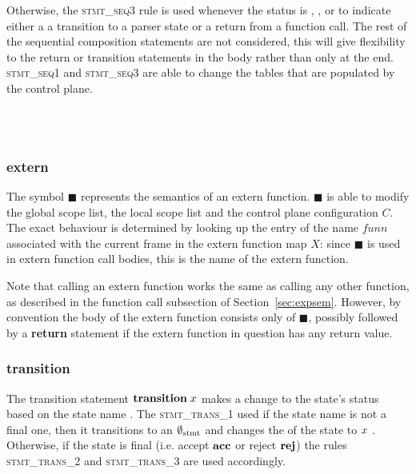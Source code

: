 \documentclass[UTF8]{article}
\begin{document}
Otherwise, the \textsc{stmt\_seq3}  rule is used whenever the status is \returnst{}, \accept{} , \reject{} or \trans{} to indicate either a a transition to a parser state or a return from a function call. The rest of the sequential composition statements are not considered, this will give flexibility to the return or transition statements in the body rather than only at the end.
\textsc{stmt\_seq1} and \textsc{stmt\_seq3} are able to change the tables that are populated by the control plane.

\begin{figure}[h!]
    \ottusedrule{\ottdrulestmtXXseqOne{}} \\
    \ottusedrule{\ottdrulestmtXXseqTwo{}} \\
    \ottusedrule{\ottdrulestmtXXseqThree{}}
\end{figure}


\subsubsection*{extern}
The symbol $\blacksquare$ represents the semantics of an extern function. $\blacksquare$ is able to modify the global scope list, the local scope list and the control plane configuration $C$. The exact behaviour is determined by looking up the entry of the name $\mathit{funn}$ associated with the current frame in the extern function map $X$: since $\blacksquare$ is used in extern function call bodies, this is the name of the extern function.

Note that calling an extern function works the same as calling any other function, as described in the function call subsection of Section~\ref{sec:expsem}. However, by convention the body of the extern function consists only of $\blacksquare$, possibly followed by a \textbf{return} statement if the extern function in question has any return value.

\begin{figure}[ht!]
    \ottusedrule{\ottdrulestmtXXext{}}
\end{figure}

\subsubsection*{transition}
The transition statement $\mathbf{transition} \; x $ makes a change to the state's status \status{} based on the state name \vn{}. The \textsc{stmt\_trans\_1} used if the state name is not a final one, then it transitions to an $\emptyset_{ \mathrm{stmt} }{}$ and changes the \status{} of the state to \trans{} $x$ . Otherwise, if the state is final (i.e. accept $\textbf{acc}$ or reject $\reject$) the rules \textsc{stmt\_trans\_2} and \textsc{stmt\_trans\_3} are used accordingly.
\end{document}
